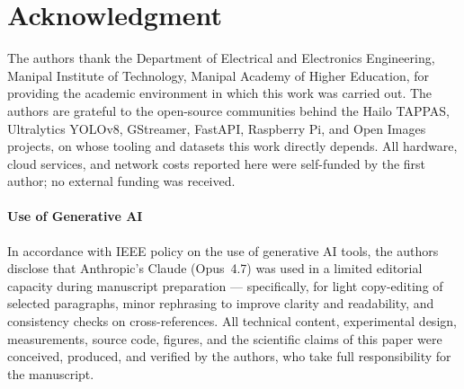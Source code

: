 \documentclass{ieeeaccess}
\begin{document}
\section*{Acknowledgment}
The authors thank the Department of Electrical and Electronics Engineering, Manipal Institute of Technology, Manipal Academy of Higher Education, for providing the academic environment in which this work was carried out. The authors are grateful to the open-source communities behind the Hailo TAPPAS, Ultralytics YOLOv8, GStreamer, FastAPI, Raspberry Pi, and Open Images projects, on whose tooling and datasets this work directly depends. All hardware, cloud services, and network costs reported here were self-funded by the first author; no external funding was received.

\paragraph*{Use of Generative AI}
In accordance with IEEE policy on the use of generative AI tools, the authors disclose that Anthropic's Claude (Opus~4.7) was used in a limited editorial capacity during manuscript preparation --- specifically, for light copy-editing of selected paragraphs, minor rephrasing to improve clarity and readability, and consistency checks on cross-references. All technical content, experimental design, measurements, source code, figures, and the scientific claims of this paper were conceived, produced, and verified by the authors, who take full responsibility for the manuscript.
\end{document}

